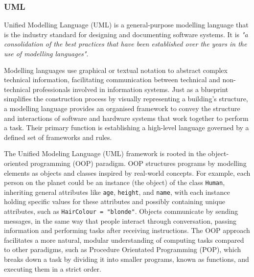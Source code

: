 \documentclass{article}
\begin{document}
{\subsubsection{UML}

Unified Modelling Language (UML) is a general-purpose modelling language that is the industry standard for designing and documenting software systems. It is \textit{"a consolidation of the best practices that have been established over the years in the use of modelling languages"}\cite{Seidl_Scholz_Huemer_Kappel_Duffy_2014}.

Modelling languages use graphical or textual notation to abstract complex technical information, facilitating communication between technical and non-technical professionals involved in information systems. Just as a blueprint simplifies the construction process by visually representing a building’s structure, a modelling language provides an organised framework to convey the structure and interactions of software and hardware systems that work together to perform a task\cite{Seidl_Scholz_Huemer_Kappel_Duffy_2014}. Their primary function is establishing a high-level language governed by a defined set of frameworks and rules\cite{Modelinglanguagemean}.

The Unified Modeling Language (UML) framework is rooted in the object-oriented programming (OOP) paradigm. OOP structures programs by modelling elements as objects and classes inspired by real-world concepts\cite{Seidl_Scholz_Huemer_Kappel_Duffy_2014}. For example, each person on the planet could be an instance (the object) of the class \texttt{Human}, inheriting general attributes like \texttt{age}, \texttt{height}, and \texttt{name}, with each instance holding specific values for these attributes and possibly containing unique attributes, such as \texttt{HairColour = "blonde"}. Objects communicate by sending messages\cite{stefik1985object}, in the same way that people interact through conversation, passing information and performing tasks after receiving instructions. The OOP approach facilitates a more natural, modular understanding of computing tasks compared to other paradigms, such as Procedure Orientated Programming (POP), which breaks down a task by dividing it into smaller programs, known as functions, and executing them in a strict order\cite{OOPPOP}.

}
\end{document}
